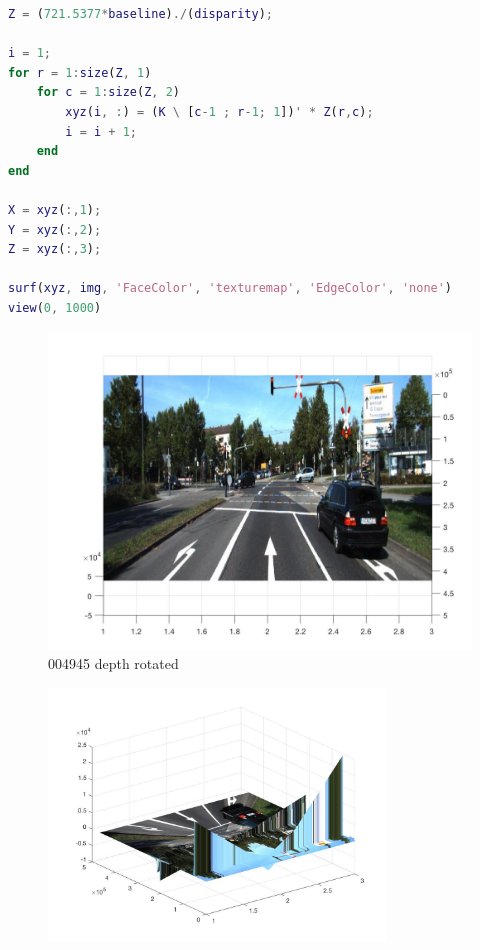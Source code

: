 \documentclass{csc_assignment4}
\begin{document}
\begin{description}
\begin{enumerate}[label=(\alph*)]
\begin{lstlisting}[language=MATLAB]
Z = (721.5377*baseline)./(disparity);

i = 1;
for r = 1:size(Z, 1)
    for c = 1:size(Z, 2)
        xyz(i, :) = (K \ [c-1 ; r-1; 1])' * Z(r,c);
        i = i + 1;
    end
end

X = xyz(:,1);
Y = xyz(:,2);
Z = xyz(:,3);

surf(xyz, img, 'FaceColor', 'texturemap', 'EdgeColor', 'none')
view(0, 1000)
\end{lstlisting}
\begin{figure}[h]
\includegraphics[width=1.0\textwidth, center]{data/a4q1c/004945_depth.jpg}
\vspace*{-5mm}
\caption{004945 depth rotated}
\end{figure}
\begin{figure}
\includegraphics[width=0.8\textwidth, center]{data/a4q1c/004945_depth_rotated.jpg}
\vspace*{-5mm}

\end{figure}
\end{enumerate}
\end{description}
\end{document}
